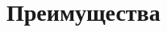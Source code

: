 \section{Преимущества}

\begin{frame}
\frametitle{\insertsection} 
\framesubtitle{\insertsubsection}
\end{frame}